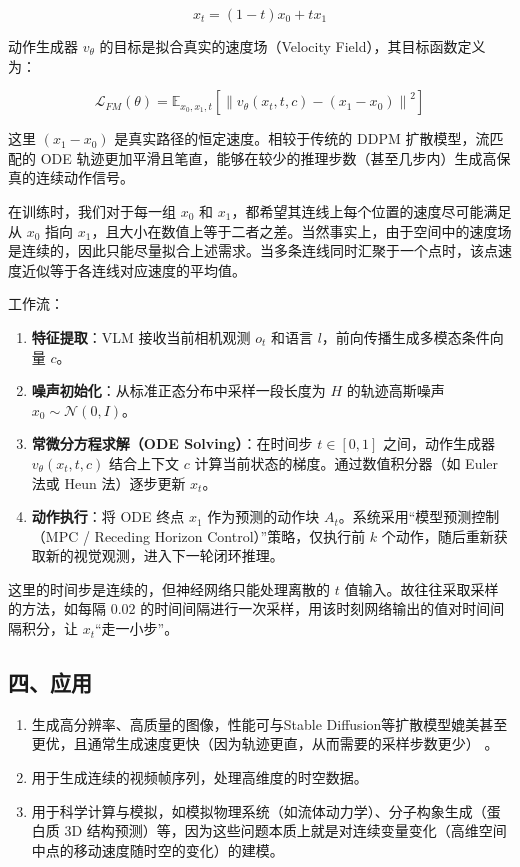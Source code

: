 \[
x_t=(1-t)x_0+tx_1
\]

动作生成器 \(v_\theta\) 的目标是拟合真实的速度场（Velocity Field），其目标函数定义为：

\[
\mathcal{L}_{FM}(\theta)=\mathbb{E}_{x_0,x_1,t}\left[\left\|v_\theta(x_t,t,c)-(x_1-x_0)\right\|^2\right]
\]

这里 \((x_1-x_0)\) 是真实路径的恒定速度。相较于传统的 DDPM 扩散模型，流匹配的 ODE 轨迹更加平滑且笔直，能够在较少的推理步数（甚至几步内）生成高保真的连续动作信号。

在训练时，我们对于每一组 \(x_0\) 和 \(x_1\)，都希望其连线上每个位置的速度尽可能满足从 \(x_0\) 指向 \(x_1\)，且大小在数值上等于二者之差。当然事实上，由于空间中的速度场是连续的，因此只能尽量拟合上述需求。当多条连线同时汇聚于一个点时，该点速度近似等于各连线对应速度的平均值。

工作流：

\begin{enumerate}
\def\labelenumi{\arabic{enumi}.}
\tightlist
\item
  \textbf{特征提取}：VLM 接收当前相机观测 \(o_t\) 和语言 \(l\)，前向传播生成多模态条件向量 \(c\)。
\item
  \textbf{噪声初始化}：从标准正态分布中采样一段长度为 \(H\) 的轨迹高斯噪声 \(x_0\sim\mathcal{N}(0,I)\)。
\item
  \textbf{常微分方程求解（ODE Solving）}：在时间步 \(t\in[0,1]\) 之间，动作生成器 \(v_\theta(x_t,t,c)\) 结合上下文 \(c\) 计算当前状态的梯度。通过数值积分器（如 Euler 法或 Heun 法）逐步更新 \(x_t\)。
\item
  \textbf{动作执行}：将 ODE 终点 \(x_1\) 作为预测的动作块 \(A_t\)。系统采用``模型预测控制（MPC / Receding Horizon Control）''策略，仅执行前 \(k\) 个动作，随后重新获取新的视觉观测，进入下一轮闭环推理。
\end{enumerate}

这里的时间步是连续的，但神经网络只能处理离散的 \(t\) 值输入。故往往采取采样的方法，如每隔 \(0.02\) 的时间间隔进行一次采样，用该时刻网络输出的值对时间间隔积分，让 \(x_t\)``走一小步''。

\hypertarget{ux56dbux5e94ux7528-1}{%
\subsection{四、应用}\label{ux56dbux5e94ux7528-1}}

\begin{enumerate}
\def\labelenumi{\arabic{enumi}.}
\item
  生成高分辨率、高质量的图像，性能可与Stable Diffusion等扩散模型媲美甚至更优，且通常生成速度更快（因为轨迹更直，从而需要的采样步数更少） 。
\item
  用于生成连续的视频帧序列，处理高维度的时空数据。
\item
  用于科学计算与模拟，如模拟物理系统（如流体动力学）、分子构象生成（蛋白质 3D 结构预测）等，因为这些问题本质上就是对连续变量变化（高维空间中点的移动速度随时空的变化）的建模。
\end{enumerate}

